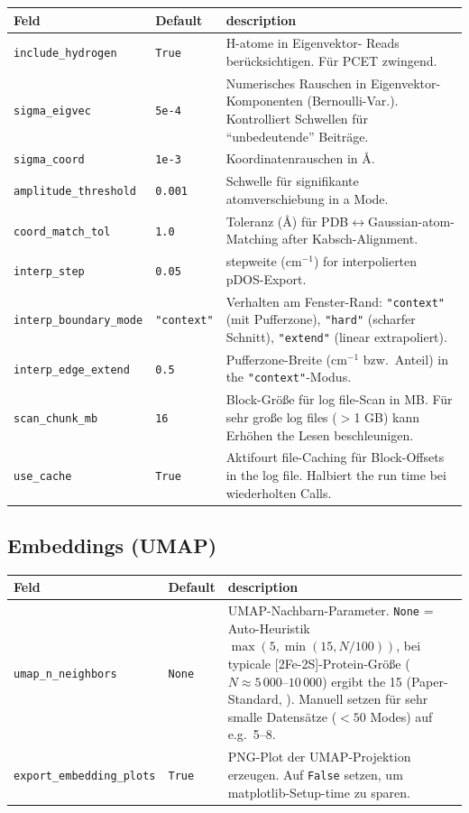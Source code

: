 \documentclass[11pt,a4paper,twoside]{article}
\theoremstyle{remark}
\begin{document}
\begin{longtable}{p{} p{} p{}}
\toprule
\textbf{Feld} & \textbf{Default} & \textbf{description} \\
\midrule
\endhead
\texttt{include\_hydrogen} & \texttt{True} & H-atome in Eigenvektor-
  Reads ber\"ucksichtigen. F\"ur PCET zwingend. \\
\texttt{sigma\_eigvec}    & \texttt{5e-4}  & Numerisches Rauschen
  in Eigenvektor-Komponenten (Bernoulli-Var.). Kontrolliert Schwellen
  f\"ur ``unbedeutende'' Beitr\"age. \\
\texttt{sigma\_coord}     & \texttt{1e-3} & Koordinatenrauschen
  in \AA{}. \\
\texttt{amplitude\_threshold} & \texttt{0.001} & Schwelle f\"ur
  signifikante atomverschiebung in a Mode. \\
\texttt{coord\_match\_tol} & \texttt{1.0}   & Toleranz (\AA{}) f\"ur
  PDB$\leftrightarrow$Gaussian-atom-Matching after Kabsch-Alignment. \\
\texttt{interp\_step}     & \texttt{0.05}  & stepweite (cm$^{-1}$)
  for interpolierten pDOS-Export. \\
\texttt{interp\_boundary\_mode} & \texttt{"context"} & Verhalten am
  Fenster-Rand: \texttt{"context"} (mit Pufferzone), \texttt{"hard"}
  (scharfer Schnitt), \texttt{"extend"} (linear extrapoliert). \\
\texttt{interp\_edge\_extend} & \texttt{0.5} & Pufferzone-Breite (cm$^{-1}$
  bzw.\ Anteil) in the \texttt{"context"}-Modus. \\
\texttt{scan\_chunk\_mb}  & \texttt{16}    & Block-Gr\"o\ss e f\"ur
  log file-Scan in MB. F\"ur sehr gro\ss e log files ($>$1 GB) kann
  Erh\"ohen the Lesen beschleunigen. \\
\texttt{use\_cache}       & \texttt{True}  & Aktifourt file-Caching f\"ur
  Block-Offsets in the log file. Halbiert the run time bei wiederholten Calls. \\
\bottomrule
\end{longtable}

\subsection{Embeddings (UMAP)}

\begin{longtable}{p{} p{} p{}}
\toprule
\textbf{Feld} & \textbf{Default} & \textbf{description} \\
\midrule
\endhead
\texttt{umap\_n\_neighbors} & \texttt{None} & UMAP-Nachbarn-Parameter.
  \texttt{None} = Auto-Heuristik $\max(5, \min(15, N/100))$, bei
  typicale [2Fe-2S]-Protein-Gr\"o{\ss}e ($N \approx 5\,000$--$10\,000$) ergibt the 15 (Paper-Standard,
  \cite{McInnes2018}). Manuell setzen f\"ur sehr smalle
  Datens\"atze ($< 50$ Modes) auf e.g.\ 5--8. \\
\texttt{export\_embedding\_plots} & \texttt{True} & PNG-Plot der
  UMAP-Projektion erzeugen. Auf \texttt{False} setzen, um
  matplotlib-Setup-time zu sparen. \\
\bottomrule
\end{longtable}
\end{document}
